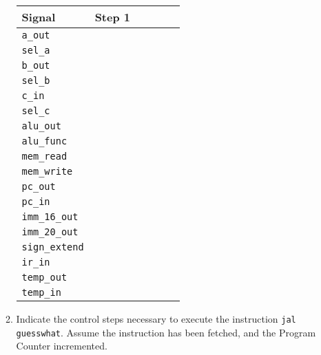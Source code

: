 \documentclass[a4paper,10pt]{article}
\begin{document}
\begin{enumerate}
\begin{enumerate}
\begin{center}
\begin{tabular}{|l|p{1.2cm}|p{1.2cm}|p{1.2cm}|p{1.2cm}|p{1.2cm}|}
\hline
\textbf{Signal} & \textbf{Step 1} & & & & \\
\hline
\texttt{a\_out} & & & & & \\
\hline
\texttt{sel\_a} & & & & & \\
\hline
\texttt{b\_out} & & & & & \\
\hline
\texttt{sel\_b} & & & & & \\
\hline
\texttt{c\_in} & & & & & \\
\hline
\texttt{sel\_c} & & & & & \\
\hline
\texttt{alu\_out} & & & & & \\
\hline
\texttt{alu\_func} & & & & & \\
\hline
\texttt{mem\_read} & & & & & \\
\hline
\texttt{mem\_write} & & & & & \\
\hline
\texttt{pc\_out} & & & & & \\
\hline
\texttt{pc\_in} & & & & & \\
\hline
\texttt{imm\_16\_out} & & & & & \\
\hline
\texttt{imm\_20\_out} & & & & & \\
\hline
\texttt{sign\_extend} & & & & & \\
\hline
\texttt{ir\_in} & & & & & \\
\hline
\texttt{temp\_out} & & & & & \\
\hline
\texttt{temp\_in} & & & & & \\
\hline
\end{tabular}
\end{center}

\newpage
\item Indicate the control steps necessary to execute the instruction \texttt{jal guesswhat}. Assume the instruction has been fetched,
and the Program Counter incremented.


\end{enumerate}
\end{enumerate}
\end{document}

